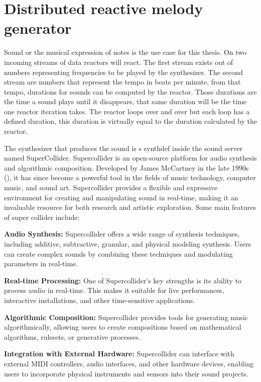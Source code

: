 \documentclass[a4paper]{book}
\begin{document}
\chapter{Distributed reactive melody generator}
Sound or the musical expression of notes is the use case for this thesis. On two incoming streams of data reactors will react. The first stream exists out of numbers representing frequencies to be played by the synthesizer. The second stream are numbers that represent the tempo in beats per minute, from that tempo, durations for sounds can be computed by the reactor. Those durations are the time a sound plays until it disappears, that same duration will be the time one reactor iteration takes. The reactor loops over and over but each loop has a defined duration, this duration is virtually equal to the duration calculated by the reactor. 

The synthesizer that produces the sound is s synthdef inside the sound server named SuperCollider. Supercollider is an open-source platform for audio synthesis and algorithmic composition. Developed by James McCartney in the late 1990s (\cite{scBook}), it has since become a powerful tool in the fields of music technology, computer music, and sound art. Supercollider provides a flexible and expressive environment for creating and manipulating sound in real-time, making it an invaluable resource for both research and artistic exploration. Some main features of super collider include:

\textbf{Audio Synthesis:} Supercollider offers a wide range of synthesis techniques, including additive, subtractive, granular, and physical modeling synthesis. Users can create complex sounds by combining these techniques and modulating parameters in real-time.


\textbf{Real-time Processing:} One of Supercollider's key strengths is its ability to process audio in real-time. This makes it suitable for live performances, interactive installations, and other time-sensitive applications.

\textbf{Algorithmic Composition:} Supercollider provides tools for generating music algorithmically, allowing users to create compositions based on mathematical algorithms, rulesets, or generative processes.

\textbf{Integration with External Hardware:} Supercollider can interface with external MIDI controllers, audio interfaces, and other hardware devices, enabling users to incorporate physical instruments and sensors into their sound projects.
\end{document}
